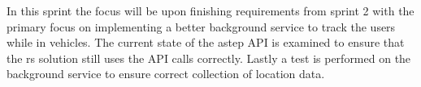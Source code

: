 In this sprint the focus will be upon finishing requirements from  sprint 2 with the primary focus on implementing a better background service to track the users while in vehicles.
The current state of the \gls{astep} API is examined to ensure that the \gls{rs} solution still uses the API calls correctly.
Lastly a test is performed on the background service to ensure correct collection of location data.